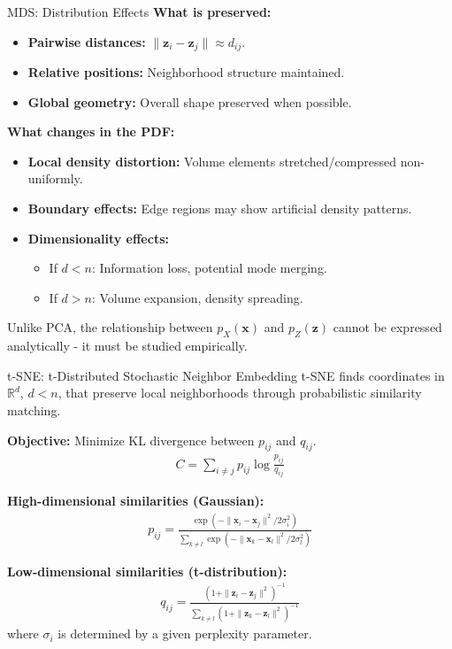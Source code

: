 \documentclass{beamer}
\begin{document}
\begin{frame}{MDS: Distribution Effects}
  \textbf{What is preserved:}
  \begin{itemize}
    \item \textbf{Pairwise distances:} $\|\mathbf{z}_i - \mathbf{z}_j\| \approx d_{ij}$. 
    \item \textbf{Relative positions:} Neighborhood structure maintained.
    \item \textbf{Global geometry:} Overall shape preserved when possible.
  \end{itemize}
  
  \vspace{0.3cm}
  \textbf{What changes in the PDF:}
  \begin{itemize}
    \item \textbf{Local density distortion:} Volume elements stretched/compressed non-uniformly.
    \item \textbf{Boundary effects:} Edge regions may show artificial density patterns.
    \item \textbf{Dimensionality effects:} 
    \begin{itemize}
      \item If $d < n$: Information loss, potential mode merging.
      \item If $d > n$: Volume expansion, density spreading.
    \end{itemize}
  \end{itemize}
  
  \vspace{0.3cm} \alert{Unlike PCA, the relationship between
    $p_X(\mathbf{x})$ and $p_Z(\mathbf{z})$ cannot be expressed
    analytically - it must be studied empirically.}
\end{frame}

\begin{frame}{t-SNE: t-Distributed Stochastic Neighbor Embedding}
  t-SNE finds coordinates in $\mathbb{R}^d$, $d < n$, that
  \alert{preserve local neighborhoods} through probabilistic
  similarity matching.
  
  \textbf{Objective:} Minimize KL divergence between $p_{ij}$ and $q_{ij}$.
  \begin{align*}
    C = \sum_{i \neq j} p_{ij} \log \frac{p_{ij}}{q_{ij}}
  \end{align*}
  
  \textbf{High-dimensional similarities (Gaussian):}
  \begin{align*}
    p_{ij} = \frac{\exp(-\|\mathbf{x}_i - \mathbf{x}_j\|^2 / 2\sigma_i^2)}{\sum_{k \neq l} \exp(-\|\mathbf{x}_k - \mathbf{x}_l\|^2 / 2\sigma_l^2)}
  \end{align*}
  
  \textbf{Low-dimensional similarities (t-distribution):}
  \begin{align*}
    q_{ij} = \frac{(1 + \|\mathbf{z}_i - \mathbf{z}_j\|^2)^{-1}}{\sum_{k \neq l} (1 + \|\mathbf{z}_k - \mathbf{z}_l\|^2)^{-1}}
  \end{align*}  
  where $\sigma_i$ is determined by a given \alert{perplexity parameter}.
\end{frame}
\end{document}
